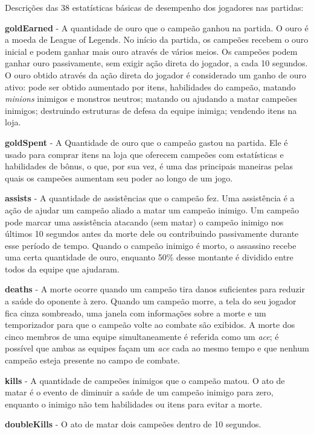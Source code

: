 Descrições das 38 estatísticas básicas de desempenho dos jogadores nas partidas:

\textbf{goldEarned} - A quantidade de ouro que o campeão ganhou na partida. O ouro é a moeda de League of Legends. No início da partida, os campeões recebem o ouro inicial e podem ganhar mais ouro através de vários meios. Os campeões podem ganhar ouro passivamente, sem exigir ação direta do jogador, a cada 10 segundos. O ouro obtido através da ação direta do jogador é considerado um ganho de ouro ativo: pode ser obtido aumentado por itens, habilidades do campeão, matando \textit{minions} inimigos e monstros neutros; matando ou ajudando a matar campeões inimigos; destruindo estruturas de defesa da equipe inimiga; vendendo itens na loja.

\textbf{goldSpent} - A Quantidade de ouro que o campeão gastou na partida. Ele é usado para comprar itens na loja que oferecem campeões com estatísticas e habilidades de bônus, o que, por sua vez, é uma das principais maneiras pelas quais os campeões aumentam seu poder ao longo de um jogo.

\textbf{assists} - A quantidade de assistências que o campeão fez. Uma assistência é a ação de ajudar um campeão aliado a matar um campeão inimigo. Um campeão pode marcar uma assistência atacando (sem matar) o campeão inimigo nos últimos 10 segundos antes da morte dele ou contribuindo passivamente durante esse período de tempo. Quando o campeão inimigo é morto, o assassino recebe uma certa quantidade de ouro, enquanto 50\% desse montante é dividido entre todos da equipe que ajudaram.

\textbf{deaths} - A morte ocorre quando um campeão tira danos suficientes para reduzir a saúde do oponente à zero. Quando um campeão morre, a tela do seu jogador fica cinza sombreado, uma janela com informações sobre a morte e um temporizador para que o campeão volte ao combate são exibidos. A morte dos cinco membros de uma equipe simultaneamente é referida como um \textit{ace}; é possível que ambas as equipes façam um \textit{ace} cada ao mesmo tempo e que nenhum campeão esteja presente no campo de combate.

\textbf{kills} - A quantidade de campeões inimigos que o campeão matou. O ato de matar é o evento de diminuir a saúde de um campeão inimigo para zero, enquanto o inimigo não tem habilidades ou itens para evitar a morte.

\textbf{doubleKills} - O ato de matar dois campeões dentro de 10 segundos.

